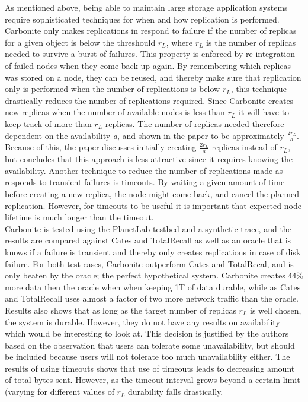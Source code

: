 \documentclass{article}
\begin{document}
\noindent As mentioned above, being able to maintain large storage application systems require sophisticated techniques for when and how replication is performed. Carbonite only makes replications in respond to failure if the number of replicas for a given object is below the threshould $r_L$, where $r_L$ is the number of replicas needed to survive a burst of failures. This property is enforced by re-integration of failed nodes when they come back up again. By remembering which replicas was stored on a node, they can be reused, and thereby make sure that replication only is performed when the number of replications is below $r_L$, this technique drastically reduces the number of replications required. Since Carbonite creates new replicas when the number of available nodes is less than $r_L$ it will have to keep track of more than $r_L$ replicas. The number of replicas needed therefore dependent on the availability \textit{a}, and shown in the paper to be approximately $\frac{2r_L}{a}$. Because of this, the paper discusses initially creating $\frac{2r_L}{a}$ replicas instead of $r_L$, but concludes that this approach is less attractive since it requires knowing the availability.
Another technique to reduce the number of replications made as responds to transient failures is timeouts. By waiting a given amount of time before creating a new replica, the node might come back, and cancel the planned replication. However, for timeouts to be useful it is important that  expected node lifetime is much longer than the timeout.\\

\noindent Carbonite is tested using the PlanetLab testbed and a synthetic trace, and the results are compared against Cates and TotalRecall as well as an oracle that is knows if a failure is transient and thereby only creates replications in case of disk failure. For both test cases, Carbonite outperform Cates and TotalRecal, and is only beaten by the oracle; the perfect hypothetical system. Carbonite creates 44\% more data then the oracle when when keeping 1T of data durable, while as Cates and TotalRecall uses almost a factor of two more network traffic than the oracle. Results also shows that as long as the target number of replicas $r_L$ is well chosen, the system is durable. However, they do not have any results on availability which would be interesting to look at. This decision is justified by the authors based on the observation that users can tolerate some unavailability, but should be included because users will not tolerate too much unavailability either. 
The results of using timeouts shows that use of timeouts leads to decreasing amount of total bytes sent. However, as the timeout interval grows beyond a certain limit (varying for different values of $r_L$ durability falls drastically.\\
\end{document}
